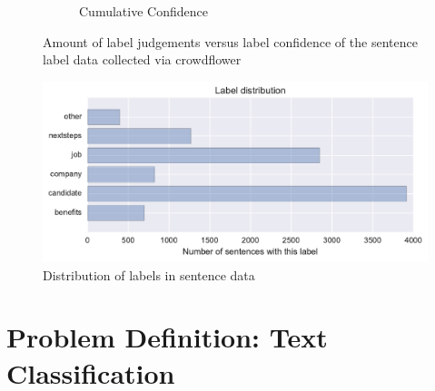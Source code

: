 \begin{figure}[h]
\begin{subfigure}[b]{0.43\textwidth}
        \caption{Cumulative Confidence}
\label{fig:sentence-data-judgement-confidence-cumulative}
    \end{subfigure}
    \caption{Amount of label judgements versus label confidence of the sentence label data collected via crowdflower}
\label{fig:sentence-data-judgements}
\end{figure}



\begin{figure}[h]
    \centering
    \includegraphics[width=\textwidth]{img/sentence-data-label-dist.pdf}
    \caption{Distribution of labels in sentence data}
\label{fig:sentence-data-label-dist}
\end{figure}

\section{Problem Definition: Text Classification}
\label{sec:Problem Definition: Text Classification}
